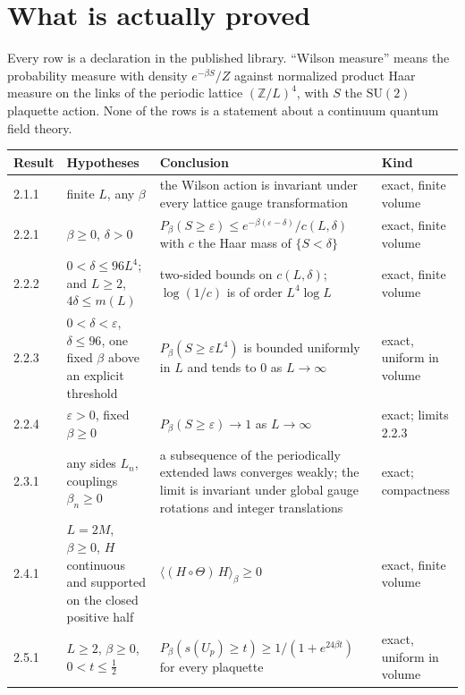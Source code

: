 \documentclass[11pt]{article}
\numberwithin{equation}{subsection}
\theoremstyle{plain}
\theoremstyle{definition}
\newcommand{\Z}{\mathbb{Z}}
\newcommand{\SU}{\mathrm{SU}}
\begin{document}
\tableofcontents

\section*{What is actually proved}

Every row is a declaration in the published library. ``Wilson measure'' means the probability
measure with density $e^{-\beta S}/Z$ against normalized product Haar measure on the links of
the periodic lattice $(\Z/L)^4$, with $S$ the $\SU(2)$ plaquette action. None of the rows is a
statement about a continuum quantum field theory.

{\small
\begin{longtable}{@{}>{\raggedright}p{}>{\raggedright}p{}>{\raggedright}p{}>{\raggedright\arraybackslash}p{}@{}}
\toprule
Result & Hypotheses & Conclusion & Kind \\
\midrule
\endhead
2.1.1 & finite $L$, any $\beta$ & the Wilson action is invariant under every lattice gauge transformation & exact, finite volume \\
2.2.1 & $\beta\ge 0$, $\delta>0$ & $P_\beta(S\ge\varepsilon)\le e^{-\beta(\varepsilon-\delta)}/c(L,\delta)$ with $c$ the Haar mass of $\{S<\delta\}$ & exact, finite volume \\
2.2.2 & $0<\delta\le 96L^4$; and $L\ge 2$, $4\delta\le m(L)$ & two-sided bounds on $c(L,\delta)$; $\log(1/c)$ is of order $L^4\log L$ & exact, finite volume \\
2.2.3 & $0<\delta<\varepsilon$, $\delta\le 96$, one fixed $\beta$ above an explicit threshold & $P_\beta(S\ge\varepsilon L^4)$ is bounded uniformly in $L$ and tends to $0$ as $L\to\infty$ & exact, uniform in volume \\
2.2.4 & $\varepsilon>0$, fixed $\beta\ge 0$ & $P_\beta(S\ge\varepsilon)\to 1$ as $L\to\infty$ & exact; limits 2.2.3 \\
2.3.1 & any sides $L_n$, couplings $\beta_n\ge 0$ & a subsequence of the periodically extended laws converges weakly; the limit is invariant under global gauge rotations and integer translations & exact; compactness \\
2.4.1 & $L=2M$, $\beta\ge 0$, $H$ continuous and supported on the closed positive half & $\langle (H\circ\Theta)\,H\rangle_\beta\ge 0$ & exact, finite volume \\
2.5.1 & $L\ge 2$, $\beta\ge 0$, $0<t\le\frac12$ & $P_\beta(s(U_p)\ge t)\ge 1/(1+e^{24\beta t})$ for every plaquette & exact, uniform in volume \\

\end{longtable}}
\end{document}
